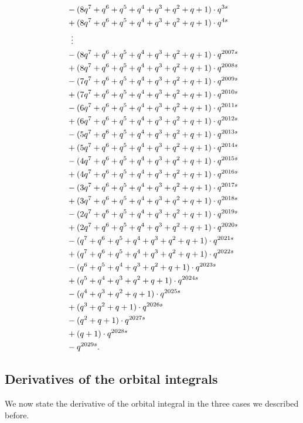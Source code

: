 \begin{example}
\begin{align*}
    &- (8q^7+q^6+q^5+q^4+q^3+q^2+q+1) \cdot q^{3s} \\
    &+ (8q^7+q^6+q^5+q^4+q^3+q^2+q+1) \cdot q^{4s} \\
    &\vdotswithin= \\
    &- (8q^7+q^6+q^5+q^4+q^3+q^2+q+1) \cdot q^{2007s} \\
    &+ (8q^7+q^6+q^5+q^4+q^3+q^2+q+1) \cdot q^{2008s} \\
    &- (7q^7+q^6+q^5+q^4+q^3+q^2+q+1) \cdot q^{2009s} \\
    &+ (7q^7+q^6+q^5+q^4+q^3+q^2+q+1) \cdot q^{2010s} \\
    &- (6q^7+q^6+q^5+q^4+q^3+q^2+q+1) \cdot q^{2011s} \\
    &+ (6q^7+q^6+q^5+q^4+q^3+q^2+q+1) \cdot q^{2012s} \\
    &- (5q^7+q^6+q^5+q^4+q^3+q^2+q+1) \cdot q^{2013s} \\
    &+ (5q^7+q^6+q^5+q^4+q^3+q^2+q+1) \cdot q^{2014s} \\
    &- (4q^7+q^6+q^5+q^4+q^3+q^2+q+1) \cdot q^{2015s} \\
    &+ (4q^7+q^6+q^5+q^4+q^3+q^2+q+1) \cdot q^{2016s} \\
    &- (3q^7+q^6+q^5+q^4+q^3+q^2+q+1) \cdot q^{2017s} \\
    &+ (3q^7+q^6+q^5+q^4+q^3+q^2+q+1) \cdot q^{2018s} \\
    &- (2q^7+q^6+q^5+q^4+q^3+q^2+q+1) \cdot q^{2019s} \\
    &+ (2q^7+q^6+q^5+q^4+q^3+q^2+q+1) \cdot q^{2020s} \\
    &- (q^7+q^6+q^5+q^4+q^3+q^2+q+1) \cdot q^{2021s} \\
    &+ (q^7+q^6+q^5+q^4+q^3+q^2+q+1) \cdot q^{2022s} \\
    &- (q^6+q^5+q^4+q^3+q^2+q+1) \cdot q^{2023s} \\
    &+ (q^5+q^4+q^3+q^2+q+1) \cdot q^{2024s} \\
    &- (q^4+q^3+q^2+q+1) \cdot q^{2025s} \\
    &+ (q^3+q^2+q+1) \cdot q^{2026s} \\
    &- (q^2+q+1) \cdot q^{2027s} \\
    &+ (q+1) \cdot q^{2028s} \\
    &- q^{2029s}.
  \end{align*}
\end{example}

\subsection{Derivatives of the orbital integrals}
We now state the derivative of the orbital integral in the three cases we described before.

